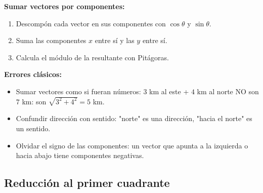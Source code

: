 \documentclass[12pt, letterpaper]{article}
\providecommand{\sen}{\sin}
\begin{document}
\begin{cuadropasos}
  \textbf{Sumar vectores por componentes:}
  \begin{enumerate}[leftmargin=*]
    \item Descompón cada vector en sus componentes con $\cos \theta$ y $\sen \theta$.
    \item Suma las componentes $x$ entre sí y las $y$ entre sí.
    \item Calcula el módulo de la resultante con Pitágoras.
  \end{enumerate}
\end{cuadropasos}

\begin{cuadroadvertencia}
  \textbf{Errores clásicos:}
  \begin{itemize}[leftmargin=*]
    \item Sumar vectores como si fueran números: $3$ km al este + $4$ km al norte NO son $7$ km: son $\sqrt{3^2 + 4^2} = 5$ km.
    \item Confundir dirección con sentido: "norte" es una dirección, "hacia el norte" es un sentido.
    \item Olvidar el signo de las componentes: un vector que apunta a la izquierda o hacia abajo tiene componentes negativas.
  \end{itemize}
\end{cuadroadvertencia}

\subsection{Reducción al primer cuadrante}
\end{document}
